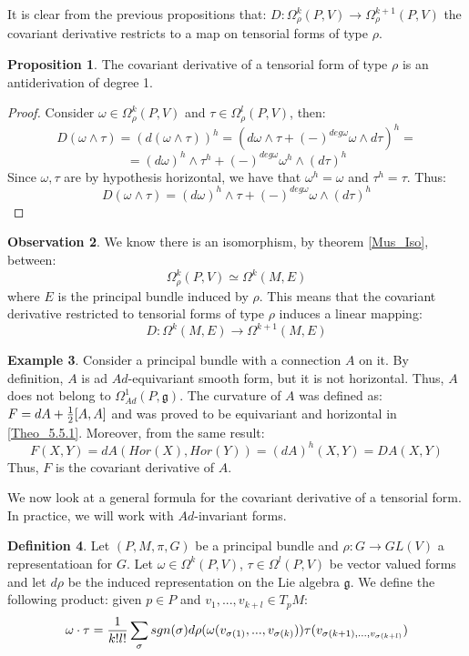 \documentclass[12pt,a4paper]{report}
\theoremstyle{definition}
\newtheorem{Def}{Definition}[chapter]
\theoremstyle{Theorem}
\newtheorem{Prop}[Def]{Proposition}
\theoremstyle{definition}
\newtheorem{Ex}[Def]{Example}
\theoremstyle{definition}
\newtheorem{Obs}[Def]{Observation}
\begin{document}
	It is clear from the previous propositions that: $D:\Omega^k_\rho(P,V)\rightarrow \Omega^{k+1}_\rho(P,V)$ the covariant derivative restricts to a map on tensorial forms of type $\rho$.
	\begin{Prop}\label{Prop_6.3.3}
		The covariant derivative of a tensorial form of type $\rho$ is an antiderivation of degree 1.
	\end{Prop}
	\begin{proof}
		Consider $\omega\in\Omega^k_\rho(P,V)$ and $\tau\in \Omega^l_\rho(P,V)$, then:
		$$D(\omega\wedge \tau)=(d(\omega\wedge\tau))^h=(d\omega\wedge \tau+(-)^{deg\omega}\omega\wedge  d\tau)^h=$$
		$$=(d\omega)^h\wedge \tau^h+(-)^{deg\omega}\omega^h\wedge(  d\tau)^h$$
		Since $\omega,\tau$ are by hypothesis horizontal, we have that $\omega^h=\omega$ and $\tau^h=\tau$. Thus:
		$$D(\omega\wedge \tau)=(d\omega)^h\wedge \tau+(-)^{deg\omega}\omega\wedge (d\tau)^h$$
	\end{proof}
	\begin{Obs}
		We know there is an isomorphism, by theorem \ref{Mus_Iso}, between:
		$$\Omega^k_\rho(P,V)\simeq\Omega^k(M,E)$$ where $E$ is the principal bundle induced by $\rho$. This means that the covariant derivative restricted to tensorial forms of type $\rho$ induces a linear mapping:
		$$D:\Omega^k(M,E)\rightarrow\Omega^{k+1}(M,E)$$
	\end{Obs}
	\begin{Ex}\label{Ex_6.3.1}
		Consider a principal bundle with a connection $A$ on it. By definition, $A$ is ad $Ad$-equivariant smooth form, but it is not horizontal. Thus, $A$ does not belong to $\Omega^1_{Ad}(P,\mathfrak{g})$. The curvature of $A$ was defined as:
		$F=dA+{1\over 2}[A,A]$ and was proved to be equivariant and horizontal in \ref{Theo_5.5.1}. Moreover, from the same result:
		$$F(X,Y)=dA(Hor(X),Hor(Y))=(dA)^h(X,Y)=DA(X,Y)$$
		Thus, $F$ is the covariant derivative of $A$.
	\end{Ex}
	We now look at a general formula for the covariant derivative of a tensorial form. In practice, we will work with $Ad$-invariant forms.
	\begin{Def}\label{Def_6.3.3}
		Let $(P,M,\pi,G)$ be a principal bundle and $\rho:G\rightarrow GL(V)$ a representatioan for $G$. Let $\omega\in \Omega^k(P,V)$, $\tau\in\Omega^l(P,V)$ be vector valued forms and let $d\rho$ be the induced representation on the Lie algebra $\mathfrak{g}$. We define the following product: given $p\in P$ and $v_1,...,v_{k+l}\in T_pM$:
		$$\omega\cdot \tau={1\over k!l!}\sum_\sigma sgn(\sigma)d\rho(\omega(v_{\sigma(1)},...,v_{\sigma(k)}))\tau(v_{\sigma(k+1),...,v_{\sigma(k+l)}})$$
	\end{Def}
\end{document}
